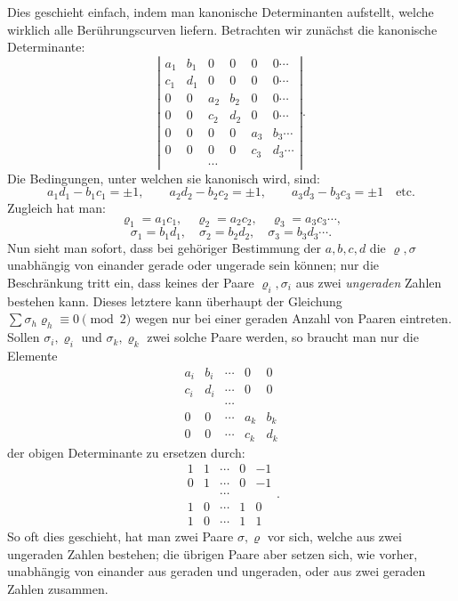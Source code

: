 \documentclass[10pt]{article}
\begin{document}
Dies geschieht einfach, indem man kanonische Determinanten aufstellt, welche wirklich alle Berührungscurven liefern. Betrachten wir zunächst die kanonische Determinante:
\[
\left|
\begin{array}{cccccc}
a_1&b_1&0&0&0&0\cdots\\
c_1&d_1&0&0&0&0\cdots\\
0&0&a_2&b_2&0&0\cdots\\
0&0&c_2&d_2&0&0\cdots\\
0&0&0&0&a_3&b_3\cdots\\
0&0&0&0&c_3&d_3\cdots\\
&&\cdots
\end{array}
\right|.
\]
Die Bedingungen, unter welchen sie kanonisch wird, sind:
\[
a_1d_1-b_1c_1=\pm1,\qquad
a_2d_2-b_2c_2=\pm1,\qquad
a_3d_3-b_3c_3=\pm1\quad\text{etc.}
\]
Zugleich hat man:
\[
\varrho_1=a_1c_1,\quad\varrho_2=a_2c_2,\quad\varrho_3=a_3c_3\cdots,
\]
\[
\sigma_1=b_1d_1,\quad\sigma_2=b_2d_2,\quad\sigma_3=b_3d_3\cdots .
\]
Nun sieht man sofort, dass bei gehöriger Bestimmung der \(a,b,c,d\) die \(\varrho,\sigma\) unabhängig von einander gerade oder ungerade sein können; nur die Beschränkung tritt ein, dass keines der Paare \(\varrho_i,\sigma_i\) aus zwei \emph{ungeraden} Zahlen bestehen kann. Dieses letztere kann überhaupt der Gleichung \(\sum\sigma_h\varrho_h\equiv0\pmod{2}\) wegen nur bei einer geraden Anzahl von Paaren eintreten. Sollen \(\sigma_i,\varrho_i\) und \(\sigma_k,\varrho_k\) zwei solche Paare werden, so braucht man nur die Elemente
\[
\begin{array}{ccccc}
a_i&b_i&\cdots&0&0\\
c_i&d_i&\cdots&0&0\\
&&\cdots\\
0&0&\cdots&a_k&b_k\\
0&0&\cdots&c_k&d_k
\end{array}
\]
der obigen Determinante zu ersetzen durch:
\[
\begin{array}{ccccc}
1&1&\cdots&0&-1\\
0&1&\cdots&0&-1\\
&&\cdots\\
1&0&\cdots&1&0\\
1&0&\cdots&1&1
\end{array}.
\]
So oft dies geschieht, hat man zwei Paare \(\sigma,\varrho\) vor sich, welche aus zwei ungeraden Zahlen bestehen; die übrigen Paare aber setzen sich, wie vorher, unabhängig von einander aus geraden und ungeraden, oder aus zwei geraden Zahlen zusammen.
\end{document}
